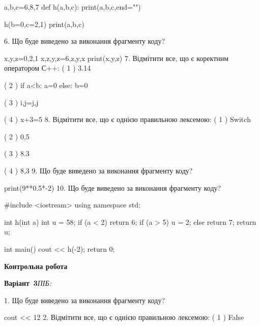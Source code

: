 \documentclass[11pt]{article}
\begin{document}
a,b,c=6,8,7
def h(a,b,c):
    print(a,b,c,end="")

h(b=0,c=2,1)
print(a,b,c)

\vspace{5mm}
6. Що буде виведено за виконання фрагменту коду?

x,y,z=0,2,1
x,z,y,z=6,z,y,x
print(x,y,z)
\vspace{5mm}
7. %
Відмітити все, що є коректним оператором С++:
( 1 ) 3.14%

( 2 ) if a<b: a=0 else: b=0

( 3 ) i,j=j,j

( 4 ) x+3=5
\vspace{5mm}
8. %
Відмітити все, що є однією правильною лексемою:
( 1 ) Switch

( 2 ) 0,5

( 3 ) 8.3

( 4 ) 8,3
\vspace{5mm}
9. Що буде виведено за виконання фрагменту коду?

print(9**0.5*-2)
\vspace{5mm}
10. Що буде виведено за виконання фрагменту коду?

#include <iostream>
using namespace std;

int h(int a){
    int u = 58;
    if (a < 2) 
        return 6;
    if (a > 5)
         u = 2;
    else
         return 7;
    return u;
}

int main(){
    cout << h(-2);
    return 0;
}

\vspace{5mm}










\newpage

\newpage

{\large\textbf{Контрольна робота}}

\textbf{Варіант \No\,3}\hfill \textit{ПІБ:}\,\underline{\hspace{60mm}}
\vspace{4mm}

1. Що буде виведено за виконання фрагменту коду?

cout << 12 %
\vspace{5mm}
2. %
Відмітити все, що є однією правильною лексемою:
( 1 ) False
\end{document}
